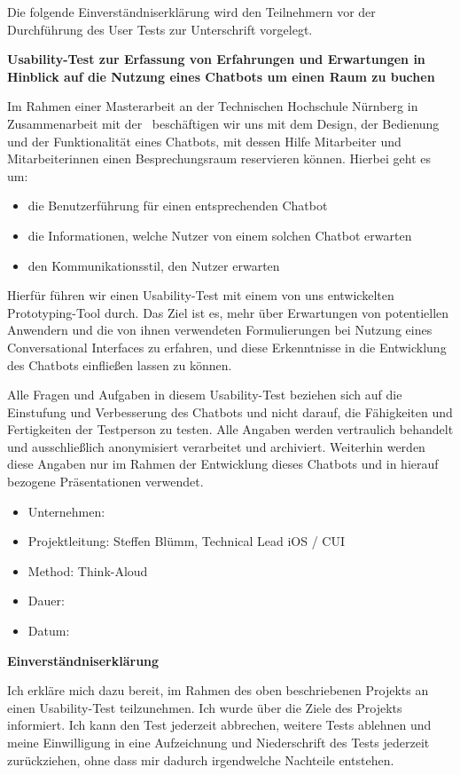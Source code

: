 Die folgende Einverständniserklärung wird den Teilnehmern vor der Durchführung des
User Tests zur Unterschrift vorgelegt.

\textbf{Usability-Test zur Erfassung von Erfahrungen und Erwartungen in Hinblick auf die Nutzung eines Chatbots um einen Raum zu buchen}

Im Rahmen einer Masterarbeit an der Technischen Hochschule Nürnberg in Zusammenarbeit mit der \adorsys\ beschäftigen wir uns mit dem Design, der Bedienung und der Funktionalität eines Chatbots, mit dessen Hilfe Mitarbeiter und Mitarbeiterinnen einen Besprechungsraum reservieren können. Hierbei geht es um:

\begin{itemize}
\item die Benutzerführung für einen entsprechenden Chatbot
\item die Informationen, welche Nutzer von einem solchen Chatbot erwarten 
\item den Kommunikationsstil, den Nutzer erwarten
\end{itemize}

Hierfür führen wir einen Usability-Test mit einem von uns entwickelten Prototyping-Tool durch. Das Ziel ist es, mehr über Erwartungen von potentiellen Anwendern und die von ihnen verwendeten Formulierungen bei Nutzung eines Conversational Interfaces zu erfahren, und diese Erkenntnisse in die Entwicklung des Chatbots einfließen lassen zu können. 

Alle Fragen und Aufgaben in diesem Usability-Test beziehen sich auf die Einstufung und Verbesserung des Chatbots und nicht darauf, die Fähigkeiten und Fertigkeiten der Testperson zu testen. Alle Angaben werden vertraulich behandelt und ausschließlich anonymisiert verarbeitet und archiviert. Weiterhin werden diese Angaben nur im Rahmen der Entwicklung dieses Chatbots und in hierauf bezogene Präsentationen verwendet.

\begin{itemize}
\item Unternehmen: \adorsys\
\item Projektleitung: Steffen Blümm, Technical Lead iOS / CUI
\item Method: Think-Aloud
\item Dauer: 
\item Datum: 
\end{itemize}

\textbf{Einverständniserklärung}

Ich erkläre mich dazu bereit, im Rahmen des oben beschriebenen Projekts an einen Usability-Test teilzunehmen. Ich wurde über die Ziele des Projekts informiert. Ich kann den Test jederzeit abbrechen, weitere Tests ablehnen und meine Einwilligung in eine Aufzeichnung und Niederschrift des Tests jederzeit zurückziehen, ohne dass mir dadurch irgendwelche Nachteile entstehen.

